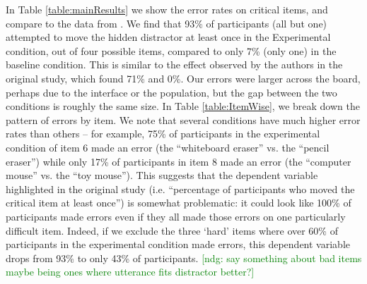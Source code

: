 \documentclass[10pt,letterpaper]{article}
\newcommand{\ndg}[1]{\textcolor{Green}{[ndg: #1]}}
\begin{document}
In Table \ref{table:mainResults} we show the error rates on critical items, and compare to the data from
.
We find that 93\% of participants (all but one) attempted to move the hidden distractor at least once in the Experimental condition, out of four possible items, compared to only 7\% (only one) in the baseline condition. This is similar to the effect observed by the authors in the original study, which found 71\% and 0\%. Our errors were larger across the board, perhaps due to the interface or the population, but the gap between the two conditions is roughly the same size.
In Table \ref{table:ItemWise}, we break down the pattern of errors by item. 
We note that several conditions have much higher error rates than others -- for example, 75\% of participants in the experimental condition of item 6 made an error (the ``whiteboard eraser'' vs. the ``pencil eraser'') while only 17\% of participants in item 8 made an error (the ``computer mouse'' vs. the ``toy mouse''). 
This suggests that the dependent variable highlighted in the original study (i.e. ``percentage of participants who moved the critical item at least once'') is somewhat problematic: it could look like 100\% of participants made errors even if they all made those errors on one particularly difficult item. Indeed, if we exclude the three `hard' items where over 60\% of participants in the experimental condition made errors, this dependent variable drops from 93\% to only 43\% of participants. 
\ndg{say something about bad items maybe being ones where utterance fits distractor better?}
\end{document}
